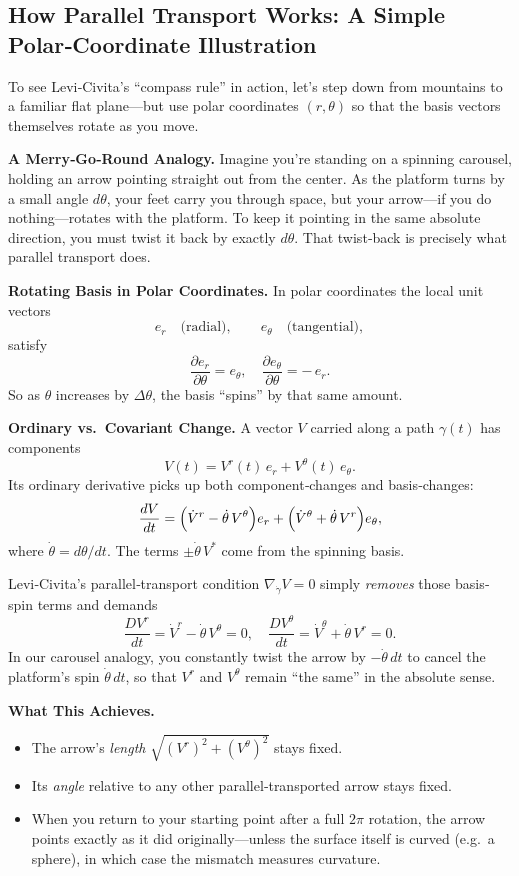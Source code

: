 \subsection{How Parallel Transport Works: A Simple Polar‐Coordinate Illustration}

To see Levi‐Civita’s “compass rule” in action, let’s step down from mountains to a familiar flat plane—but use polar coordinates \((r,\theta)\) so that the basis vectors themselves rotate as you move.

\medskip
\noindent\textbf{A Merry‐Go‐Round Analogy.}  
Imagine you’re standing on a spinning carousel, holding an arrow pointing straight out from the center.  As the platform turns by a small angle \(d\theta\), your feet carry you through space, but your arrow—if you do nothing—rotates with the platform.  To keep it pointing in the same absolute direction, you must twist it back by exactly \(d\theta\).  That twist‐back is precisely what parallel transport does.

\medskip
\noindent\textbf{Rotating Basis in Polar Coordinates.}  
In polar coordinates the local unit vectors
\[
e_r\quad\text{(radial)},\qquad
e_\theta\quad\text{(tangential)},
\]
satisfy
\[
\frac{\partial e_r}{\partial \theta} = e_\theta,
\quad
\frac{\partial e_\theta}{\partial \theta} = -\,e_r.
\]
So as \(\theta\) increases by \(\Delta\theta\), the basis “spins” by that same amount.

\medskip
\noindent\textbf{Ordinary vs.\ Covariant Change.}  
A vector \(V\) carried along a path \(\gamma(t)\) has components
\[
V(t) = V^r(t)\,e_r + V^\theta(t)\,e_\theta.
\]
Its ordinary derivative picks up both component‐changes and basis‐changes:
\[
\frac{dV}{dt}
= \Bigl(\dot V^r - \dot\theta\,V^\theta\Bigr)e_r
+ \Bigl(\dot V^\theta + \dot\theta\,V^r\Bigr)e_\theta,
\]
where \(\dot\theta = d\theta/dt\).  The terms \(\pm\dot\theta\,V^\ast\) come from the spinning basis.

Levi‐Civita’s parallel‐transport condition \(\nabla_{\dot\gamma}V=0\) simply \emph{removes} those basis‐spin terms and demands
\[
\frac{DV^r}{dt} = \dot V^r - \dot\theta\,V^\theta = 0,
\quad
\frac{DV^\theta}{dt} = \dot V^\theta + \dot\theta\,V^r = 0.
\]
In our carousel analogy, you constantly twist the arrow by \(-\dot\theta\,dt\) to cancel the platform’s spin \(\dot\theta\,dt\), so that \(V^r\) and \(V^\theta\) remain “the same” in the absolute sense.

\medskip
\noindent\textbf{What This Achieves.}  
\begin{itemize}
  \item The arrow’s \emph{length} \( \sqrt{(V^r)^2 + (V^\theta)^2}\) stays fixed.  
  \item Its \emph{angle} relative to any other parallel‐transported arrow stays fixed.
  \item When you return to your starting point after a full \(2\pi\) rotation, the arrow points exactly as it did originally—unless the surface itself is curved (e.g.\ a sphere), in which case the mismatch measures curvature.
\end{itemize}

